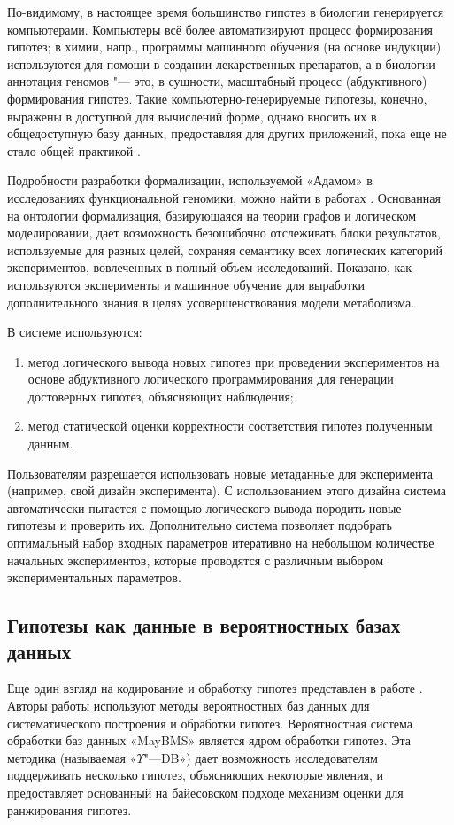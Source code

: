 По-видимому, в настоящее время большинство гипотез в биологии генерируется компьютерами. Компьютеры всё более 
автоматизируют процесс формирования гипотез; в химии, напр., программы машинного обучения (на основе индукции) 
используются для помощи в создании лекарственных препаратов, а в биологии аннотация геномов "--- это, в сущности, 
масштабный процесс (абдуктивного) формирования гипотез. Такие компьютерно-генерируемые гипотезы, конечно, выражены в 
доступной для вычислений форме, однако вносить их в общедоступную базу данных, предоставляя для других приложений, 
пока еще не стало общей практикой \cite{soldatova2011representation}.

Подробности разработки формализации, используемой «Адамом» в исследованиях функциональной геномики, можно найти в 
работах \cite{qi2010ontology,soldatova2011representation}. Основанная на онтологии формализация, базирующаяся на 
теории графов и логическом моделировании, дает возможность безошибочно отслеживать блоки результатов, используемые 
для разных целей, сохраняя семантику всех логических категорий экспериментов, вовлеченных в полный объем исследований. 
Показано, как используются эксперименты и машинное обучение для выработки дополнительного знания в целях 
усовершенствования модели метаболизма.

В системе используются: 

\begin{enumerate}
    \item метод логического вывода новых гипотез при проведении экспериментов на основе абдуктивного логического 
            программирования для генерации достоверных гипотез, объясняющих наблюдения;
    \item метод статической оценки корректности соответствия гипотез полученным данным.
\end{enumerate}

Пользователям разрешается использовать новые метаданные для эксперимента (например, свой дизайн эксперимента). 
С использованием этого дизайна система автоматически пытается с помощью логического вывода породить новые 
гипотезы и проверить их. Дополнительно система позволяет подобрать оптимальный набор входных параметров 
итеративно на небольшом количестве начальных экспериментов, которые проводятся с различным выбором 
экспериментальных параметров.

\subsection{Гипотезы как данные в вероятностных базах данных}\label{sect1_3_3}
Еще один взгляд на кодирование и обработку гипотез представлен в работе \cite{GoncalvesP14}. Авторы работы используют 
методы вероятностных баз данных для систематического построения и обработки гипотез. Вероятностная система обработки 
баз данных «MayBMS» \cite{huang2009maybms} является ядром обработки гипотез. Эта методика (называемая 
«$\Upsilon$"---DB») дает возможность исследователям поддерживать несколько гипотез, объясняющих некоторые явления, 
и предоставляет основанный на байесовском подходе механизм оценки для ранжирования гипотез.

